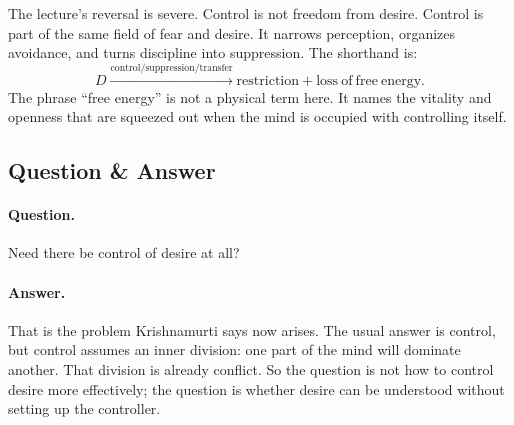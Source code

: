 The lecture's reversal is severe. Control is not freedom from desire. Control is part of the same field of fear and desire. It narrows perception, organizes avoidance, and turns discipline into suppression. The shorthand is:
\begin{equation}
D
\xrightarrow{\mathrm{control/suppression/transfer}}
\mathrm{restriction}
+
\mathrm{loss\ of\ free\ energy}.
\end{equation}
The phrase ``free energy'' is not a physical term here. It names the vitality and openness that are squeezed out when the mind is occupied with controlling itself.

\subsection{Question \& Answer}

\paragraph{Question.}
Need there be control of desire at all?

\paragraph{Answer.}
That is the problem Krishnamurti says now arises. The usual answer is control, but control assumes an inner division: one part of the mind will dominate another. That division is already conflict. So the question is not how to control desire more effectively; the question is whether desire can be understood without setting up the controller.

\begin{figure}
\centering
{}
\end{figure}

